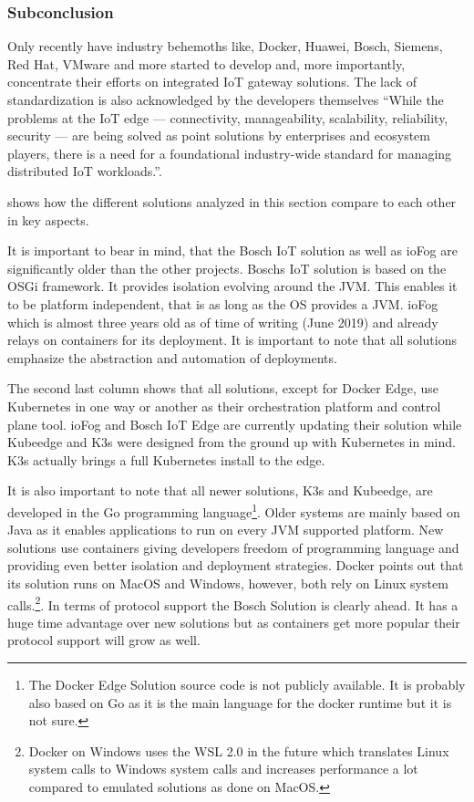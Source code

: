 \subsubsection{Subconclusion}
Only recently have industry behemoths like, Docker, Huawei, Bosch, Siemens, Red Hat, VMware and more\cite{K8sattheEdgeContectOnWorkingGroup:online} started to develop and, more importantly, concentrate their efforts on integrated IoT gateway solutions. The lack of standardization is also acknowledged by the developers themselves ``While the problems at the IoT edge — connectivity, manageability, scalability, reliability, security — are being solved as point solutions by enterprises and ecosystem players, there is a need for a foundational industry-wide standard for managing distributed IoT workloads.''\cite{ioFogK8sBlog:online}.

 shows how the different solutions analyzed in this section compare to each other in key aspects.

It is important to bear in mind, that the Bosch IoT solution as well as ioFog are significantly older than the other projects. Boschs IoT solution is based on the OSGi framework. It provides isolation evolving around the JVM. This enables it to be platform independent, that is as long as the OS provides a JVM. ioFog which is almost three years old as of time of writing (June 2019) and already relays on containers for its deployment. It is important to note that all solutions emphasize the abstraction and automation of deployments.

The second last column shows that all solutions, except for Docker Edge, use Kubernetes in one way or another as their orchestration platform and control plane tool. ioFog and Bosch IoT Edge are currently updating their solution while Kubeedge and K3s were designed from the ground up with Kubernetes in mind. K3s actually brings a full Kubernetes install to the edge.

It is also important to note that all newer solutions, K3s and Kubeedge, are developed in the Go programming language\footnote{The Docker Edge Solution source code is not publicly available. It is probably also based on Go as it is the main language for the docker runtime but it is not sure.}. Older systems are mainly based on Java as it enables applications to run on every JVM supported platform. New solutions use containers giving developers freedom of programming language and providing even better isolation and deployment strategies. Docker points out that its solution runs on MacOS and Windows, however, both rely on Linux system calls.\footnote{Docker on Windows uses the WSL 2.0 in the future which translates Linux system calls to Windows system calls and increases performance a lot compared to emulated solutions as done on MacOS.}. In terms of protocol support the Bosch Solution is clearly ahead. It has a huge time advantage over new solutions but as containers get more popular their protocol support will grow as well.



